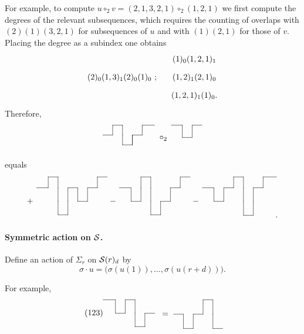 \documentclass[thesis.tex]{subfiles}
\begin{document}
For example, to compute $u\circ_2 v=(2,1,3,2,1)\circ_2(1,2,1)$ we first compute the degrees of the relevant subsequences, which requires the counting of overlaps with $(2)(1)(3,2,1)$ for subsequences of $u$ and with $(1)(2,1)$ for those of $v$. Placing the degree as a subindex one obtains
$$\xymatrix@C=1pc@R=.5pc{ & (1)_0(1,2,1)_1 \\ (2)_0(1,3)_1(2)_0(1)_0 \ ; & (1,2)_1(2,1)_0 \\ & (1,2,1)_1(1)_0.} $$
Therefore,
$$\xymatrix@C=1pc@R=.5pc{
 & \t\ar@{-}[d]\ar@{-}[r] & \t & \t & \t\ar@{-}[r] & \t  \\
\ar@{-}[r] & \t & \t\ar@{-}[u]\ar@{-}[d] & \t\ar@{-}[d]\ar@{-}[r] & \t\ar@{-}[u] &  \\
\t & \t & \t\ar@{-}[r] & \t\ar@{-}[u] & \t &  }
\xymatrix@C=1pc@R=.5pc{
\ \ \ \ar@{-}[r]  & \t\ar@{-}[d] & \t\ar@{-}[d]\ar@{-}[r] &  \\
\circ_2\  & \t\ar@{-}[r] & \t &  \\
\ \ & \t & \t &}$$
equals$$\xymatrix@C=1pc@R=.61pc{
 &\t \ar@{-}[r]&\t \ar@{-}[d]&\t &\t &\t &\t \ar@{-}[r]&\t \\
\ \ \ar@{-}[r]&\t \ar@{-}[u]&\t \ar@{-}[d]&\t \ar@{-}[r]&\t \ar@{-}[d]&\t \ar@{-}[r]&\t \ar@{-}[u]&\t \\
+ \ &\t &\t \ar@{-}[d]&\t \ar@{-}[u]&\t \ar@{-}[r]&\t \ar@{-}[u]&\t &\t \\
 &\t &\t \ar@{-}[r]&\t \ar@{-}[u]&\t &\t &\t &\t}
\xymatrix@C=1pc@R=.61pc{
 &\t &\t \ar@{-}[r]&\t \ar@{-}[d]&\t &\t &\t \ar@{-}[r]&\t \\
\ \ \ar@{-}[r]&\t \ar@{-}[d]&\t \ar@{-}[u]&\t \ar@{-}[d]&\t &\t \ar@{-}[r]&\t \ar@{-}[u]&\t \\
- \  &\t \ar@{-}[r]&\t \ar@{-}[u]&\t \ar@{-}[d]&\t \ar@{-}[r]&\t \ar@{-}[u]&\t &\t \\
 &\t &\t &\t \ar@{-}[r]&\t \ar@{-}[u]&\t &\t &\t}
\xymatrix@C=1pc@R=.61pc{
 &\t &\t &\t \ar@{-}[r]&\t \ar@{-}[d]&\t &\t \ar@{-}[r]&\t \\
\ \ \ar@{-}[r]&\t \ar@{-}[d]&\t \ar@{-}[r]&\t \ar@{-}[u]&\t \ar@{-}[d]&\t \ar@{-}[r]&\t \ar@{-}[u]&\t \\
- \ &\t \ar@{-}[r]&\t \ar@{-}[u]&\t &\t \ar@{-}[d]&\t \ar@{-}[u]&\t &\t \\
 &\t &\t &\t &\t \ar@{-}[r]&\t \ar@{-}[u]&\t & .}$$

\paragraph{Symmetric action on $\S$.} Define an action of $\Sigma_r$ on $\S(r)_d$ by $$\sigma\cdot u=\big(\sigma(u(1)),\dotsc,\sigma(u(r+d))\big).$$\par
For example,
$$\xymatrix@C=1pc@R=.45pc{
\ \ \ \ \ \ar@{-}[r] & \t\ar@{-}[d] & \t\ar@{-}[r] & \t\ar@{-}[d] & \t & \t  \\
(123) & \t\ar@{-}[r] & \t\ar@{-}[u] & \t\ar@{-}[d] & \t\ar@{-}[r] &   \\
 & \t & \t & \t\ar@{-}[r] & \t\ar@{-}[u] & }
\xymatrix@C=1pc@R=.8pc{
\ \ &\t &\t &\t \ar@{-}[r]&\t \ar@{-}[d]&\t  \\
= \ \ar@{-}[r]&\t \ar@{-}[d]&\t \ar@{-}[r]&\t \ar@{-}[u]&\t \ar@{-}[d]&\t  \\
 &\t \ar@{-}[r]&\t \ar@{-}[u]&\t &\t \ar@{-}[r]&\t
}$$
\end{document}
